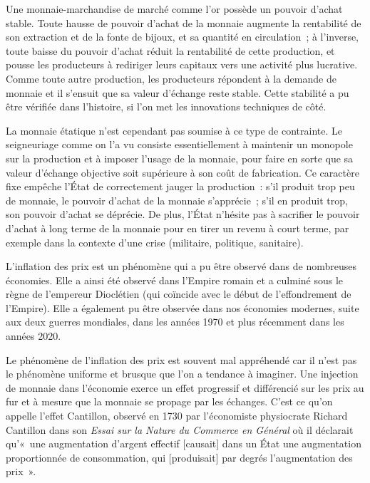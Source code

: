 Une monnaie-marchandise de marché comme l'or possède un pouvoir d'achat stable. Toute hausse de pouvoir d'achat de la monnaie augmente la rentabilité de son extraction et de la fonte de bijoux, et sa quantité en circulation~; à l'inverse, toute baisse du pouvoir d'achat réduit la rentabilité de cette production, et pousse les producteurs à rediriger leurs capitaux vers une activité plus lucrative. Comme toute autre production, les producteurs répondent à la demande de monnaie et il s'ensuit que sa valeur d'échange reste stable. Cette stabilité a pu être vérifiée dans l'histoire, si l'on met les innovations techniques de côté.

La monnaie étatique n'est cependant pas soumise à ce type de contrainte. Le seigneuriage comme on l'a vu consiste essentiellement à maintenir un monopole sur la production et à imposer l'usage de la monnaie, pour faire en sorte que sa valeur d'échange objective soit supérieure à son coût de fabrication. Ce caractère fixe empêche l'État de correctement jauger la production~: s'il produit trop peu de monnaie, le pouvoir d'achat de la monnaie s'apprécie~; s'il en produit trop, son pouvoir d'achat se déprécie. De plus, l'État n'hésite pas à sacrifier le pouvoir d'achat à long terme de la monnaie pour en tirer un revenu à court terme, par exemple dans la contexte d'une crise (militaire, politique, sanitaire).

L'inflation des prix est un phénomène qui a pu être observé dans de nombreuses économies. Elle a ainsi été observé dans l'Empire romain et a culminé sous le règne de l'empereur Dioclétien (qui coïncide avec le début de l'effondrement de l'Empire). Elle a également pu être observée dans nos économies modernes, suite aux deux guerres mondiales, dans les années 1970 et plus récemment dans les années 2020.


Le phénomène de l'inflation des prix est souvent mal appréhendé car il n'est pas le phénomène uniforme et brusque que l'on a tendance à imaginer. Une injection de monnaie dans l'économie exerce un effet progressif et différencié sur les prix au fur et à mesure que la monnaie se propage par les échanges. C'est ce qu'on appelle l'effet Cantillon, observé en 1730 par l'économiste physiocrate Richard Cantillon dans son \emph{Essai sur la Nature du Commerce en Général} où il déclarait qu'«~une augmentation d'argent effectif [causait] dans un État une augmentation proportionnée de consommation, qui [produisait] par degrés l'augmentation des prix~». %

